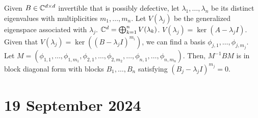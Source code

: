 \documentclass{article}
\begin{document}
Given $B \in \mathbb{C}^{d \times d}$ invertible that is possibly defective, let $\lambda_1, \hdots, \lambda_n$ be its distinct eigenvalues with multiplicities $m_1, \hdots, m_n$. Let $V(\lambda_j)$ be the generalized eigenspace associated with $\lambda_j$. $\mathbb{C}^{d} = \bigoplus_{k = 1}^n V(\lambda_k)$. $V(\lambda_j) = \ker(A - \lambda_j I)$. Given that $V(\lambda_j) = \ker((B - \lambda_j I)^{m_i})$, we can find a basis $\phi_{j, 1}, \hdots, \phi_{j, m_j}$. Let $M = (\phi_{1, 1}, \hdots, \phi_{1, m_1}, \phi_{2, 1}, \hdots, \phi_{2, m_2}, \hdots, \phi_{n, 1}, \hdots, \phi_{n, m_n})$. Then, $M^{-1} B M$ is in block diagonal form with blocks $B_1, \hdots, B_n$ satisfying $(B_j - \lambda_jI)^{m_j} = 0$. 


\section*{19 September 2024}
\end{document}

